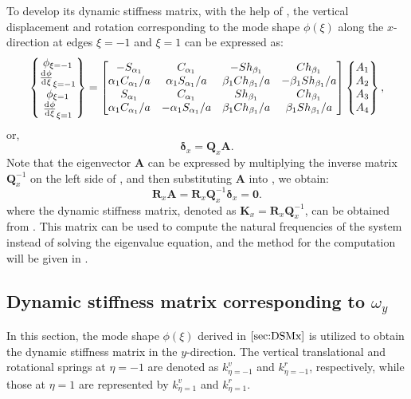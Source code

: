 \documentclass[preprint,12pt]{elsarticle}
\newcommand{\id}{\mathrm{d}\mkern1mu}
\begin{document}
To develop its dynamic stiffness matrix, with the help of , the vertical displacement and rotation corresponding to the mode shape $\phi(\xi)$ along the $x$-direction at edges $\xi = -1$ and $\xi = 1$ can be expressed as:
%
\begin{equation}\label{eq:UBx}
	\begin{split}
		\begin{Bmatrix}
			\phi_{\xi=-1}\\\frac{\id \phi}{\id \xi}_{\xi=-1}\\\phi_{\xi=1}\\\frac{\id \phi}{\id \xi}_{\xi=1}
		\end{Bmatrix}
		= \begin{bmatrix}
			-S_{\alpha_1}&C_{\alpha_1}&-Sh_{\beta_1}&Ch_{\beta_1}\\
			\alpha_1 C_{\alpha_1}/a&\alpha_1S_{\alpha_1}/a&\beta_1Ch_{\beta_1}/a&-\beta_1Sh_{\beta_1}/a\\
			S_{\alpha_1}&C_{\alpha_1}&Sh_{\beta_1}&Ch_{\beta_1}\\
			\alpha_1 C_{\alpha_1}/a&-\alpha_1S_{\alpha_1}/a&\beta_1Ch_{\beta_1}/a&\beta_1Sh_{\beta_1}/a
		\end{bmatrix}
		\begin{Bmatrix}
			A_1\\A_2\\A_3\\A_4
		\end{Bmatrix} ,
	\end{split}
\end{equation}
%
or,
%
\begin{equation}\label{eq:UBx1}
	\mathbf{\delta}_x= \mathbf{Q}_x\mathbf{A}.
\end{equation}
%
Note that the eigenvector $\mathbf{A}$ can be expressed by multiplying the inverse matrix $\mathbf{Q}_x^{-1}$ on the left side of , and then substituting $\mathbf{A}$ into , we obtain:
%
\begin{equation}\label{eq:DSM_eqx}
	\mathbf{R}_x \mathbf{A}=\mathbf{R}_x\mathbf{Q}_x^{-1}\mathbf{\delta}_x = \mathbf{0}.
\end{equation}
%
where the dynamic stiffness matrix, denoted as $\mathbf{K}_x = \mathbf{R}_x\mathbf{Q}_x^{-1}$, can be obtained from . 
This matrix can be used to compute the natural frequencies of the system instead of solving the eigenvalue equation, 
and the method for the computation will be given in .

\subsection{Dynamic stiffness matrix corresponding to $\omega_y$}\label{sec:DSMy}
In this section, the mode shape $\phi(\xi)$ derived in $\Cref{sec:DSMx}$ is utilized to obtain the dynamic stiffness matrix in the $y$-direction.  
The vertical translational and rotational springs at $\eta = -1$ are denoted as $k^v_{\eta = -1}$ and $k^r_{\eta = -1}$, respectively, while those at $\eta = 1$ are represented by $k^v_{\eta = 1}$ and $k^r_{\eta = 1}$.
\end{document}
